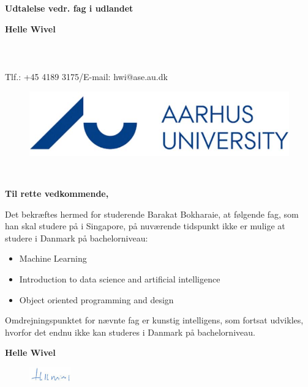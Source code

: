 \documentclass[../Ansoegning.tex]{subfiles}
\begin{document}
\par{\centering
		{\Large \textbf{Udtalelse vedr. fag i udlandet}} \par}

\begin{minipage}[t][1.3cm][t]{0.6\textwidth}
\textbf{Helle Wivel}                                    \\
                             \\
                     \\
             \\
 Tlf.: +45 4189 3175/E-mail: hwi@ase.au.dk  \\
\end{minipage} %
\begin{minipage}[t][1.5cm][t]{0.25\textwidth}
\vspace{-1cm}
\begin{figure}[H]
	\flushright
	\includegraphics[width=1.5\textwidth]{Billeder/AUlogo.JPG}
\end{figure}
\end{minipage} \\ \vspace{4cm}

\textbf{Til rette vedkommende,}

Det bekræftes hermed for studerende Barakat Bokharaie, at følgende fag, som han skal studere på {\NTU } i Singapore, på nuværende tidspunkt ikke er mulige at studere i Danmark på bachelorniveau:

\begin{itemize}
    \item Machine Learning
    \item Introduction to data science and artificial intelligence
    \item Object oriented programming and design
\end{itemize}

Omdrejningspunktet for nævnte fag er kunstig intelligens, som fortsat udvikles, hvorfor det endnu ikke kan studeres i Danmark på bachelorniveau.

\textbf{Helle Wivel}
\begin{figure}[H]
	\flushleft
	\includegraphics[width=0.16\textwidth]{Billeder/wivlogo.JPG}
\end{figure}
\end{document}
